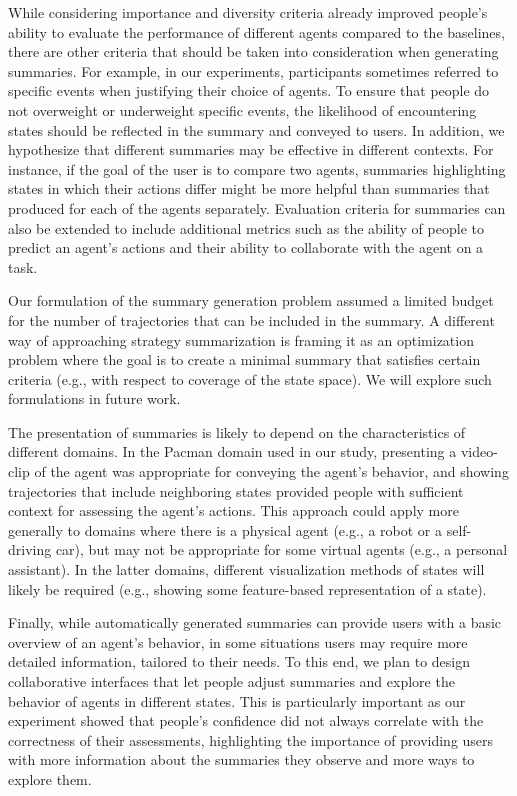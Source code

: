 While considering importance and diversity criteria already improved people's ability to evaluate the performance of different agents compared to the baselines, there are other criteria that should be taken into consideration when generating summaries. For example, in our experiments, participants sometimes referred to specific events when justifying their choice of agents. To ensure that people do not overweight or underweight specific events, the likelihood of encountering states should be reflected in the summary and conveyed to users. In addition, we hypothesize that different summaries may be effective in different contexts. For instance, if the goal of the user is to compare two agents, summaries highlighting states in which their actions differ might be more helpful than summaries that produced for each of the agents separately. Evaluation criteria for summaries can also be extended to include additional metrics such as the ability of people to predict an agent's actions and their ability to collaborate with the agent on a task. 

Our formulation of the summary generation problem assumed a limited budget for the number of trajectories that can be included in the summary. A different way of approaching strategy summarization is framing it as an optimization problem where the goal is to create a minimal summary that satisfies certain criteria (e.g., with respect to coverage of the state space). We will explore such formulations in future work. 

The presentation of summaries is likely to depend on the characteristics of different domains. In the Pacman domain used in our study, presenting a video-clip of the agent was appropriate for conveying the agent's behavior, and showing trajectories that include neighboring states provided people with sufficient context for assessing the agent's actions. This approach could apply more generally to domains where there is a physical agent (e.g., a robot or a self-driving car), but may not be appropriate for some virtual agents (e.g., a personal assistant). In the latter domains, different visualization methods of states will likely be required (e.g., showing some feature-based representation of a state). 

Finally, while automatically generated summaries can provide users with a basic overview of an agent's behavior, in some situations users may require more detailed information, tailored to their needs. To this end, we plan to design collaborative interfaces that let people adjust summaries and explore the behavior of agents in different states. This is particularly important as our experiment showed that people's confidence did not always correlate with the correctness of their assessments, highlighting the importance of providing users with more information about the summaries they observe and more ways to explore them. 




